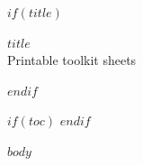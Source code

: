 \documentclass[11pt]{article}
\begin{document}
$if(title)$
\begin{center}
{\LARGE \textbf{$title$}}\\[6pt]
{\small Printable toolkit sheets}
\end{center}
\vspace{8pt}
$endif$

$if(toc)$
\tableofcontents
\newpage
$endif$

$body$
\end{document}
